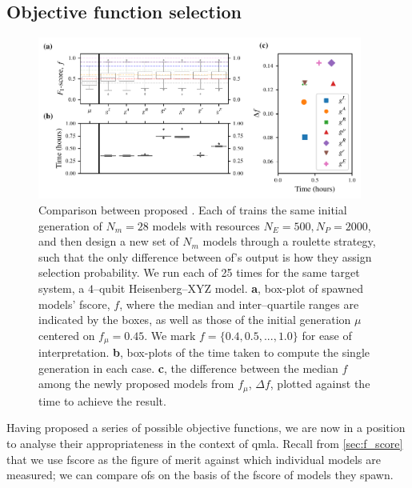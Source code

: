 {\subsection{Objective function selection}\label{sec:obj_fnc_selection}
\begin{figure}
    \centering
    \includegraphics[width=0.95\textwidth]{theoretical_study/figures/objective_fnc_comparison.pdf}
    \caption[Comparison between proposed objective functions]{
        Comparison between proposed . 
        Each \gls{of} trains the same initial generation of $N_m=28$ models with resources
        $N_E=500, N_P=2000$, and then design a new set of $N_m$ models through 
        a roulette strategy, such that the only difference between \gls{of}'s output 
        is how they assign selection probability.
        We run each \gls{of} 25 times for the same target system, 
            a $4$--qubit Heisenberg--XYZ model. 
        \textbf{a}, box-plot of spawned models' \gls{fscore}, $f$, 
            where the median and inter--quartile ranges are indicated by the boxes,
            as well as those of the initial generation $\mu$ centered on $f_{\mu}=0.45$.
            We mark $f=\{0.4, 0.5, ..., 1.0\}$ for ease of interpretation. 
        \textbf{b}, box-plots of the time taken to compute the single generation in each case.
        \textbf{c}, the difference between the median $f$ among the 
            newly proposed models from $f_{\mu}$, $\Delta f$,
            plotted against the time to achieve the result. 
    }
    \label{fig:obj_fnc_comparison}
\end{figure}

Having proposed a series of possible objective functions, 
    we are now in a position to analyse their appropriateness in the context of \gls{qmla}. 
Recall from \cref{sec:f_score} that we use \gls{fscore} as the figure of merit against which individual models are measured;
    we can compare \glspl{of} on the basis of the \gls{fscore} of models they spawn.

}
